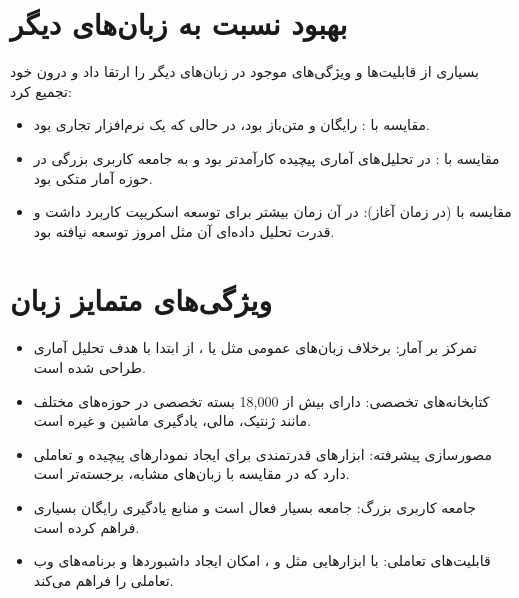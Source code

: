 \documentclass[11pt, a4paper, oneside]{book}
\begin{document}
		
		\section{بهبود نسبت به زبان‌های دیگر}
		
			 بسیاری از قابلیت‌ها و ویژگی‌های موجود در زبان‌های دیگر را ارتقا داد و درون خود تجمیع کرد:
			
			\begin{itemize}
				
				\item {\large مقایسه با }:
				{\normalsize رایگان و متن‌باز بود، در حالی که  یک نرم‌افزار تجاری بود.}
				
				\item {\large مقایسه با }:
				{\normalsize در تحلیل‌های آماری پیچیده کارآمدتر بود و به جامعه کاربری بزرگی در حوزه آمار متکی بود.}
				
				\item {\large مقایسه با  (در زمان آغاز)}:
				{\normalsize {} در آن زمان بیشتر برای توسعه اسکریپت کاربرد داشت و قدرت تحلیل داده‌ای آن مثل امروز توسعه نیافته بود.}
				
			\end{itemize}
			
		
		\section{ویژگی‌های متمایز زبان}
			
			\begin{itemize}
				
				\item {\large تمرکز بر آمار}:
				{\normalsize برخلاف زبان‌های عمومی مثل  یا ،  از ابتدا با هدف تحلیل آماری طراحی شده است.}
				
				\item {\large کتابخانه‌های تخصصی}:
				{\normalsize {} دارای بیش از 18,000 بسته تخصصی در حوزه‌های مختلف مانند ژنتیک، مالی، یادگیری ماشین و غیره است.}
				
				\item {\large مصورسازی پیشرفته}:
				{\normalsize {} ابزارهای قدرتمندی برای ایجاد نمودارهای پیچیده و تعاملی دارد که در مقایسه با زبان‌های مشابه، برجسته‌تر است.}
				
				\item {\large جامعه کاربری بزرگ}:
				{\normalsize جامعه  بسیار فعال است و منابع یادگیری رایگان بسیاری فراهم کرده است.}
				
				\item {\large قابلیت‌های تعاملی}:
				{\normalsize با ابزارهایی مثل  و ،  امکان ایجاد داشبوردها و برنامه‌های وب تعاملی را فراهم می‌کند.}
				
			\end{itemize}
			
\end{document}

